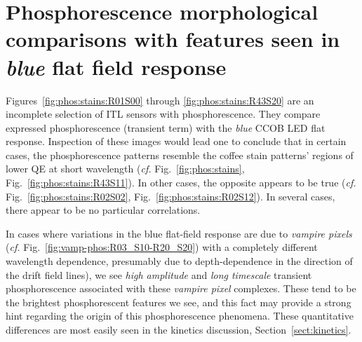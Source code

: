 \section{Phosphorescence morphological comparisons with features seen in {\it blue} flat field response}

Figures~\ref{fig:phos:stains:R01S00} through \ref{fig:phos:stains:R43S20} are an incomplete selection of ITL sensors with phosphorescence. They compare expressed phosphorescence (transient term) with the {\it blue} CCOB LED flat response. Inspection of these images would lead one to conclude that in certain cases, the phosphorescence patterns resemble the coffee stain patterns' regions of lower QE at short wavelength ({\it cf.} Fig.~\ref{fig:phos:stains}, Fig.~\ref{fig:phos:stains:R43S11}). In other cases, the opposite appears to be true ({\it cf.} Fig.~\ref{fig:phos:stains:R02S02}, Fig.~\ref{fig:phos:stains:R02S12}). In several cases, there appear to be no particular correlations. 

In cases where variations in the blue flat-field response are due to {\it vampire pixels} ({\it cf.} Fig.~\ref{fig:vamp-phos:R03_S10-R20_S20}) with a completely different wavelength dependence, presumably due to depth-dependence in the direction of the drift field lines), we see {\it high amplitude} and {\it long timescale} transient phosphorescence associated with these {\it vampire pixel} complexes. These tend to be the brightest phosphorescent features we see, and this fact may provide a strong hint regarding the origin of this phosphorescence phenomena. These quantitative differences are most easily seen in the kinetics discussion, Section~\ref{sect:kinetics}.

